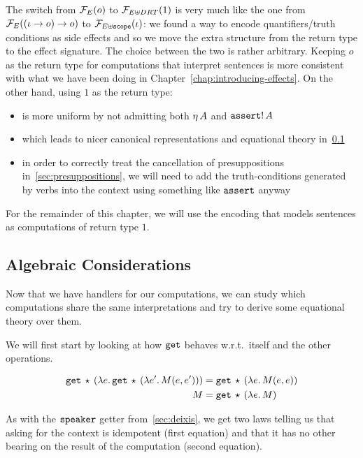 The switch from $\mathcal{F}_E(o)$ to $\mathcal{F}_{E \uplus DRT}(1)$ is very much like the
one from $\mathcal{F}_E((\iota \to o) \to o)$ to
$\mathcal{F}_{E \uplus \mathtt{scope}}(\iota)$: we found a way to encode
quantifiers/truth conditions as side effects and so we move the extra
structure from the return type to the effect signature. The choice between
the two is rather arbitrary. Keeping $o$ as the return type for
computations that interpret sentences is more consistent with what we have
been doing in Chapter~\ref{chap:introducing-effects}. On the other hand,
using $1$ as the return type:

\begin{itemize}
\item is more uniform by not admitting both $\eta\,A$ and
  $\mathtt{assert}!\,A$
\item which leads to nicer canonical representations and equational theory
  in~\ref{ssec:algebraic-drt}
\item in order to correctly treat the cancellation of presuppositions
  in~\ref{sec:presuppositions}, we will need to add the truth-conditions
  generated by verbs into the context using something like $\mathtt{assert}$
  anyway
\end{itemize}

For the remainder of this chapter, we will use the encoding that models
sentences as computations of return type $1$.


\subsection{Algebraic Considerations}
\label{ssec:algebraic-drt}

Now that we have handlers for our computations, we can study which
computations share the same interpretations and try to derive some
equational theory over them.

We will first start by looking at how $\mathtt{get}$ behaves w.r.t.\ itself and
the other operations.

\begin{align*}
   \mathtt{get}\,\star\,(\lambda e.\, \mathtt{get}\,\star\,(\lambda e'.\, M(e, e')))
&= \mathtt{get}\,\star\,(\lambda e.\, M(e, e)) \\
   M
&= \mathtt{get}\,\star\,(\lambda e.\, M)
\end{align*}

As with the $\mathtt{speaker}$ getter from~\ref{sec:deixis}, we get two laws
telling us that asking for the context is idempotent (first equation) and
that it has no other bearing on the result of the computation (second
equation).

